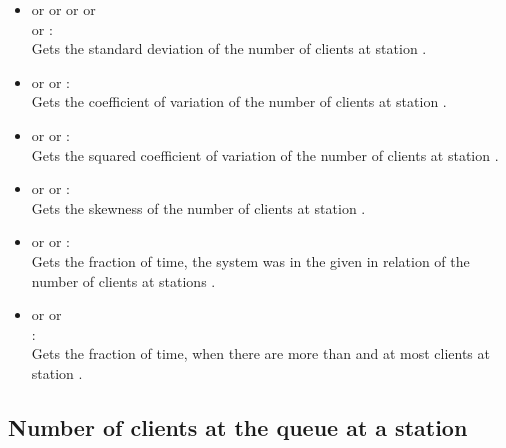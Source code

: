 \begin{itemize}
\item
{} or  or  or  or\\
 or :\\
Gets the standard deviation of the number of clients at station .

\item
{} or  or :\\
Gets the coefficient of variation of the number of clients at station .

\item
{} or  or :\\
Gets the squared coefficient of variation of the number of clients at station .

\item
{} or  or :\\
Gets the skewness of the number of clients at station .

\item
{} or  or :\\
Gets the fraction of time, the system was in the given  in relation of the number of clients at stations .

\item
{} or  or\\
:\\
Gets the fraction of time, when there are more than  and at most  clients at station .

\end{itemize}



\subsection{Number of clients at the queue at a station}

